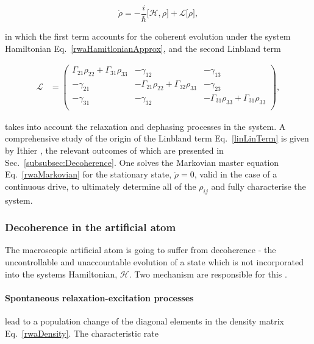   \begin{equation}
  	\dot{\rho} = -\frac{i}{\hbar}\big[\mathcal{H},\rho\big]+\mathcal{L}\big[\rho\big],
  	\label{rwaMarkovian}
  \end{equation}
  
  \noindent in which the first term accounts for the coherent evolution under the system Hamiltonian Eq.~\eqref{rwaHamitlonianApprox}, and the second Linbland term
    
  \begin{equation}
	  \label{linLinTerm}
	  \begin{aligned}
	  \mathcal{L} & = \begin{pmatrix}
	  \Gamma_{21}\rho_{22} + \Gamma_{31}\rho_{33} & -\gamma_{12} & -\gamma_{13}\\
	  -\gamma_{21} & -\Gamma_{21}\rho_{22} + \Gamma_{32}\rho_{33} & -\gamma_{23}\\
	  -\gamma_{31} & -\gamma_{32} & -\Gamma_{31}\rho_{33} + \Gamma_{31}\rho_{33}\\
	  \end{pmatrix},
	  \end{aligned}
  \end{equation}
  
  \noindent takes into account the relaxation and dephasing processes in the system. A comprehensive study of the origin of the Linbland term Eq.~\eqref{linLinTerm} is given by Ithier \cite{ithier}, the relevant outcomes of which are presented in Sec.~\ref{subsubsec:Decoherence}. One solves the Markovian master equation Eq.~\eqref{rwaMarkovian} for the stationary state, $ \dot{\rho}=0 $, valid in the case of a continuous drive, to ultimately determine all of the $ \rho_{ij} $ and fully characterise the system.
    
 \subsubsection{Decoherence in the artificial atom \label{subsubsec:Decoherence}}
   The macroscopic artificial atom is going to suffer from decoherence - the uncontrollable and unaccountable evolution of a state which is not incorporated into the systems Hamiltonian, $ \mathcal{H} $. Two mechanism are responsible for this \cite {ithier,QuantumstateengineeringwithJosephsonjunctiondevices}.
   
   \paragraph{Spontaneous relaxation-excitation processes} lead to a population change of the diagonal elements in the density matrix Eq.~\eqref{rwaDensity}. The characteristic rate 
   	

